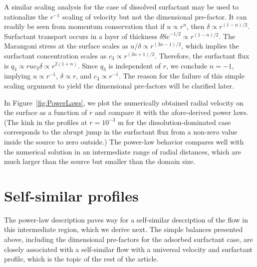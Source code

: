\documentclass[]{jfm}
\newcommand{\Sc}{\text{Sc}}
\begin{document}
A similar scaling analysis for the case of dissolved surfactant may be used to rationalize the $r^{-1}$ scaling of velocity but not the dimensional pre-factor. 
It can readily be seen from momentum conservation that if $u\propto r^n$, then $\delta \propto r^{(1-n)/2}$.
Surfactant transport occurs in a layer of thickness $\delta \Sc^{-1/2} \propto r^{(1-n)/2}$.
The Marangoni stress at the surface scales as $u/\delta \propto r^{(3n-1)/2}$, which implies the surfactant concentration scales as $c_3 \propto r^{(3n+1)/2}$.
Therefore, the surfactant flux is $q_3 \propto ruc_3 \delta \propto r^{2(1+n)}$. 
Since $q_3$ is independent of $r$, we conclude $n=-1$, implying $u \propto r^{-1}$, $\delta \propto r$, and $c_3 \propto r^{-1}$.
The reason for the failure of this simple scaling argument to yield the dimensional pre-factors will be clarified later.

In Figure~\ref{fig:PowerLaws}, we plot the numerically obtained radial velocity on the surface as a function of $r$ and compare it with the afore-derived power laws.
(The kink in the profiles at $r=10^{-3}$ m for the dissolution-dominated case corresponds to the abrupt jump in the surfactant flux from a non-zero value inside the source to zero outside.)
The power-law behavior compares well with the numerical solution in an intermediate range of radial distances, which are much larger than the source but smaller than the domain size.

\section{Self-similar profiles}
The power-law description paves way for a self-similar description of the flow in this intermediate region, which we derive next.
The simple balances presented above, including the dimensional pre-factors for the adsorbed surfactant case, are closely associated with a self-similar flow with a universal velocity and surfactant profile, which is the topic of the rest of the article.
\end{document}
